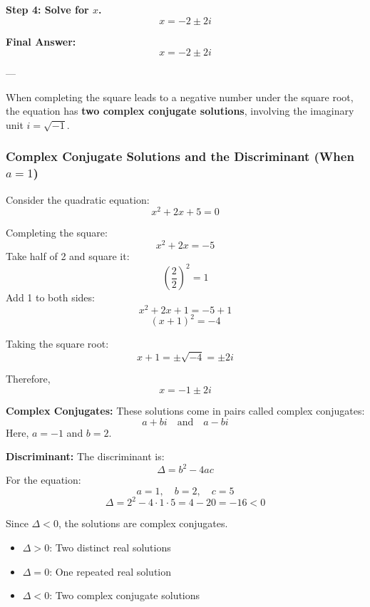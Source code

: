 \documentclass[11pt]{article}
\begin{document}
\textbf{Step 4: Solve for \( x \).}
\[
x = -2 \pm 2i
\]

\textbf{Final Answer:}
\[
\boxed{x = -2 \pm 2i}
\]

---

\begin{tcolorbox}[title=Imaginary Solutions, colback=red!5!white, colframe=red!80!black]
When completing the square leads to a negative number under the square root, the equation has \textbf{two complex conjugate solutions}, involving the imaginary unit \( i = \sqrt{-1} \).
\end{tcolorbox}
\subsubsection*{Complex Conjugate Solutions and the Discriminant (When \(a=1\))}

Consider the quadratic equation:
\[
x^2 + 2x + 5 = 0
\]

Completing the square:
\[
x^2 + 2x = -5
\]
Take half of 2 and square it:
\[
\left(\frac{2}{2}\right)^2 = 1
\]
Add 1 to both sides:
\[
x^2 + 2x + 1 = -5 + 1
\]
\[
(x + 1)^2 = -4
\]

Taking the square root:
\[
x + 1 = \pm \sqrt{-4} = \pm 2i
\]

Therefore,
\[
x = -1 \pm 2i
\]

\bigskip

\textbf{Complex Conjugates:}
These solutions come in pairs called complex conjugates:
\[
a + bi \quad \text{and} \quad a - bi
\]
Here, \(a = -1\) and \(b = 2\).

\bigskip

\textbf{Discriminant:}
The discriminant is:
\[
\Delta = b^2 - 4ac
\]
For the equation:
\[
a = 1, \quad b = 2, \quad c = 5
\]
\[
\Delta = 2^2 - 4 \cdot 1 \cdot 5 = 4 - 20 = -16 < 0
\]

Since \(\Delta < 0\), the solutions are complex conjugates.

\begin{tcolorbox}[title=Summary, colback=cyan!5!white, colframe=cyan!80!black]
\begin{itemize}
  \item \(\Delta > 0\): Two distinct real solutions
  \item \(\Delta = 0\): One repeated real solution
  \item \(\Delta < 0\): Two complex conjugate solutions
\end{itemize}
\end{tcolorbox}
\end{document}
